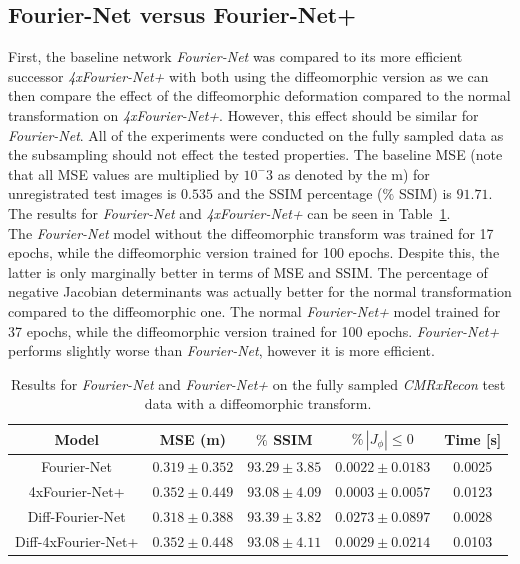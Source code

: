 \documentclass[english,version-2022-01]{uzl-thesis} %
\begin{document}
\subsection{Fourier-Net versus Fourier-Net+} \label{SubSec:ResultsFourier-NetvsFourier-Net+CMRxRecon}
First, the baseline network \emph{Fourier-Net} was compared to its more efficient successor \emph{4xFourier-Net+} with both using the diffeomorphic version as we can then compare the effect of the diffeomorphic deformation compared to the normal transformation on \emph{4xFourier-Net+}. However, this effect should be similar for \emph{Fourier-Net}. All of the experiments were conducted on the fully sampled data as the subsampling should not effect the tested properties. The baseline MSE (note that all MSE values are multiplied by $10^-3$ as denoted by the m) for unregistrated test images is $0.535$ and the SSIM percentage ($\%$ SSIM) is $91.71$. The results for \emph{Fourier-Net} and \emph{4xFourier-Net+} can be seen in Table~\ref{tab:Fourier-NetvsFourier-Net+CMRxRecon}. \\
The \emph{Fourier-Net} model without the diffeomorphic transform was trained for 17 epochs, while the diffeomorphic version trained for 100 epochs. Despite this, the latter is only marginally better in terms of MSE and SSIM. The percentage of negative Jacobian determinants was actually better for the normal transformation compared to the diffeomorphic one. The normal \emph{Fourier-Net+} model trained for 37 epochs, while the diffeomorphic version trained for 100 epochs. \emph{Fourier-Net+} performs slightly worse than \emph{Fourier-Net}, however it is more efficient.


\begin{table}[htpb]
	\centering
	\caption{Results for \emph{Fourier-Net} and \emph{Fourier-Net+} on the fully sampled \emph{CMRxRecon} test data with a diffeomorphic transform.}
	\label{tab:Fourier-NetvsFourier-Net+CMRxRecon}
	\begin{tabular}{c c c c c} %
		\toprule
		Model & MSE (m) & $\%$ SSIM & $\% \, |J_{\phi}|\leq0$ & Time [s] \\
		\midrule
		Fourier-Net & $0.319 \pm 0.352$ &  $93.29 \pm 3.85$ & $0.0022 \pm 0.0183$ & 0.0025\\ 
		4xFourier-Net+ & $0.352 \pm 0.449$ & $93.08 \pm 4.09$ & $0.0003 \pm 0.0057$ & 0.0123\\ 
		\midrule
		Diff-Fourier-Net & $0.318 \pm 0.388$ &  $93.39 \pm 3.82$ & $0.0273 \pm 0.0897$ & 0.0028\\ 
		Diff-4xFourier-Net+ & $0.352 \pm 0.448$ & $93.08 \pm 4.11$ & $0.0029 \pm 0.0214$ & 0.0103\\  
		\bottomrule
	\end{tabular}
\end{table}
\end{document}
